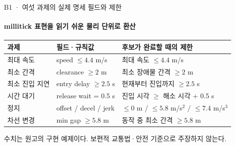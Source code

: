 \documentclass[aspectratio=169,11pt]{beamer}
\newcommand{\source}[1]{\par\vspace{2mm}{\fontsize{8}{10}\selectfont\color{muted}근거: #1\par}}
\begin{document}
\appendix

\begin{frame}{B1 · 여섯 과제의 실제 명세 필드와 제한}
  \framesubtitle{millitick 표현을 읽기 쉬운 물리 단위로 환산}
  \renewcommand{\arraystretch}{1.25}\small
  \begin{tabular}{@{}p{3.0cm}p{4.1cm}p{5.4cm}@{}}
    \toprule
    과제 & 필드·규칙값 & 후보가 완료할 때의 제한\\\midrule
    최대 속도 & speed \(\leq 4.4\) m/s & 최대 속도 \(\leq 4.4\) m/s\\
    최소 간격 & clearance \(\geq 2\) m & 최소 장애물 간격 \(\geq 2\) m\\
    최소 진입 지연 & entry delay \(\geq 2.5\) s & 현재부터 진입까지 \(\geq 2.5\) s\\
    시간 대기 & release wait = 0.5 s & 진입 시각 \(\geq\) 해소 시각 + 0.5 s\\
    정지 & offset / decel / jerk & \(\leq 0\) m / \(\leq 5.8\) m/s\(^2\) / \(\leq 7.4\) m/s\(^3\)\\
    차선 변경 & min gap \(\geq 5.8\) m & 동작 중 최소 간격 \(\geq 5.8\) m\\\bottomrule
  \end{tabular}\par
  \vspace{3mm}
  \textcolor{muted}{수치는 원고의 구현 예제이다. 보편적 교통법·안전 기준으로 주장하지 않는다.}
  \source{원고 Table 7}
\end{frame}
\end{document}
